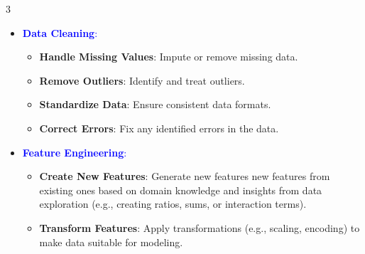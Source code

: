 \documentclass[letterpaper, 10.5pt,landscape]{article}
\begin{document}
\begin{multicols*}{3}
\begin{itemize}[leftmargin=0.35cm]
    \item \textcolor{blue}{\textbf{Data Cleaning}:} 
    \vspace{-2pt}
    \begin{itemize}[leftmargin=0.35cm]
        \vspace{-3pt}
        \item \textbf{Handle Missing Values}: Impute or remove missing data.
        \vspace{-3pt}
        \item \textbf{Remove Outliers}: Identify and treat outliers.
        \vspace{-3pt}
        \item \textbf{Standardize Data}: Ensure consistent data formats.
        \vspace{-3pt}
        \item \textbf{Correct Errors}: Fix any identified errors in the data.
    \end{itemize}
    
    \item \textcolor{blue}{\textbf{Feature Engineering}:}
    \vspace{-2pt}
    \begin{itemize}[leftmargin=0.35cm]
        \vspace{-3pt}
        \item \textbf{Create New Features}: Generate new features new features from existing ones based on domain knowledge and insights from data exploration (e.g., creating ratios, sums, or interaction terms).
        \vspace{-3pt}
        \item \textbf{Transform Features}: Apply transformations (e.g., scaling, encoding) to make data suitable for modeling.
    \end{itemize}


\end{itemize}
\end{multicols*}
\end{document}
